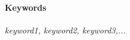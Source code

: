 %
%
%

\begin{abstract}
\lipsum[1]
\end{abstract}

\paragraph*{Keywords}{\textit{keyword1, keyword2, keyword3,...}}

\newpage 